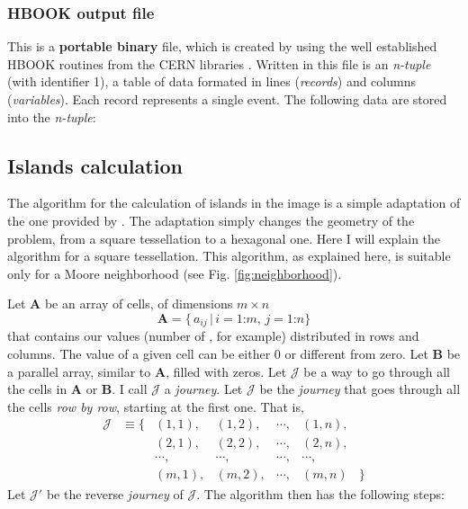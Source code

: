 \subsubsection*{HBOOK output file}

This is a \textbf{portable binary} file, which is created by using the
well established HBOOK routines from the CERN libraries
\cite{CERNlib}. Written in this file is an \emph{n-tuple} (with
identifier 1), a table of data formated in lines (\emph{records}) and
columns (\emph{variables}). Each record represents a single event. The
following data are stored into the \emph{n-tuple}:

\subsection{Islands calculation}
\label{ssec:islands}

The algorithm for the calculation of islands in the image is a simple
adaptation of the one provided by \cite{Fabero:islas}. The adaptation
simply changes the geometry of the problem, from a square tessellation
to a hexagonal one. Here I will explain the algorithm for a square
tessellation. This algorithm, as explained here, is suitable only for
a Moore neighborhood (see Fig. \ref{fig:neighborhood}).

Let $\mathbf{A}$ be an array of cells, of dimensions $m \times n$
%
\begin{equation}
\mathbf{A} = \{ \, a_{ij} \,|\, i=1\mathord{:}m,\, j=1\mathord{:}n \}
\label{eq:arrayA}
\end{equation}
%
that contains our values (number of \phes, for example) distributed in
rows and columns.  The value of a given cell can be either $0$ or
different from zero.  Let $\mathbf{B}$ be a parallel array, similar to
$\mathbf{A}$, filled with zeros. Let $\mathcal{J}$ be a way to go
through all the cells in $\mathbf{A}$ or $\mathbf{B}$. I call
$\mathcal{J}$ a \emph{journey}. Let $\mathcal{J}$ be the
\emph{journey} that goes through all the cells \emph{row by row},
starting at the first one.  That is,
%
\begin{equation}
  \begin{matrix}
    \mathcal{J} &\equiv \{ & (1,1),& (1,2),&\cdots,& (1,n),& \\
                &          & (2,1),& (2,2),&\cdots,& (2,n),& \\
                &          &\cdots,&\cdots,&\cdots,&\cdots,& \\
                &          & (m,1),& (m,2),&\cdots,& (m,n) & \}
  \end{matrix}
  \label{eq:journey}
\end{equation}
%
Let $\mathcal{J}'$ be the reverse \emph{journey} of $\mathcal{J}$.
The algorithm then has the following steps:

